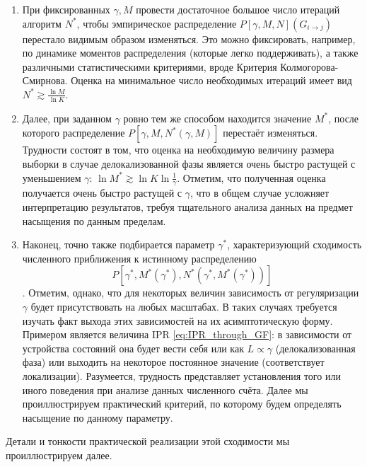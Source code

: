 \begin{enumerate}
	\item При фиксированных $\gamma, M$ провести достаточное большое число итераций алгоритм $N^*$, чтобы эмпирическое распределение $P[\gamma, M ,N](G_{i \rightarrow j})$ перестало видимым образом изменяться. Это можно фиксировать, например, по динамике моментов распределения (которые легко поддерживать), а также различными статистическими критериями, вроде Критерия Колмогорова-Смирнова. Оценка на минимальное число необходимых итераций имеет вид $N^{*} \gtrsim \frac{\ln M}{\ln K}$.
	\item Далее, при заданном $\gamma$ ровно тем же способом находится значение $M^*$, после которого распределение $P[\gamma, M, N^*(\gamma, M)]$ перестаёт изменяться. Трудности состоят в том, что оценка на необходимую величину размера выборки в случае делокализованной фазы является очень быстро растущей с уменьшением $\gamma$: $\ln M^{*} \gtrsim \ln K \ln \frac{1}{\gamma}$. 
	Отметим, что полученная оценка получается очень быстро растущей с $\gamma$, что в общем случае усложняет интерпретацию результатов, требуя тщательного анализа данных на предмет насыщения по данным пределам.
	\item Наконец, точно также подбирается параметр $\gamma^*$, характеризующий сходимость численного приближения к истинному распределению $$P\left[ \gamma^*, M^*(\gamma^*), N^*\left( \gamma^*, M^{*}(\gamma^*) \right) \right]$$. Отметим, однако, что для некоторых величин зависимость от регуляризации $\gamma$ будет присутствовать на любых масштабах. В таких случаях требуется изучать факт выхода этих зависимостей на их асимптотическую форму. Примером является величина IPR \eqref{eq:IPR_through_GF}: в зависимости от устройства состояний она будет вести себя или как $L \propto \gamma$ (делокализованная фаза) или выходить на некоторое постоянное значение (соответствует локализации). Разумеется, трудность представляет установления того или иного поведения при анализе данных численного счёта. Далее мы проиллюстрируем практический критерий, по которому будем определять насыщение по данному параметру.
\end{enumerate}
Детали и тонкости практической реализации этой сходимости мы проиллюстрируем далее.  


